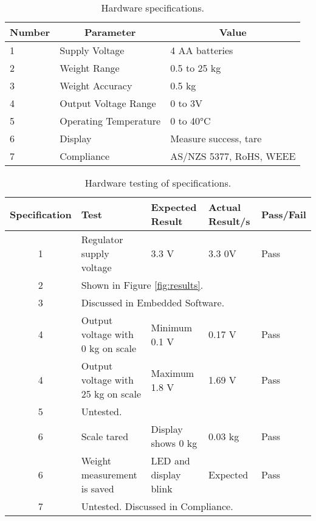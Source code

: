 \begin{table}[!ht]
	\centering
	\caption{Hardware specifications.}
	\begin{tabular}{lll}
		\hline
		\multicolumn{1}{c}{Number} & \multicolumn{1}{c}{Parameter} & \multicolumn{1}{c}{Value} \\
		\hline
		1                          & Supply Voltage                & 4 AA batteries            \\
		2                          & Weight Range                  & 0.5 to 25 kg              \\
		3                          & Weight Accuracy               & 0.5 kg                    \\
		4                          & Output Voltage Range          & 0 to 3V                   \\
		5                          & Operating Temperature         & 0 to 40°C                 \\
		6                          & Display                       & Measure success, tare     \\
		7                          & Compliance                    & AS/NZS 5377, RoHS, WEEE  
	\end{tabular}
	\label{tab:hardware-requirements}
\end{table}

\begin{table}[!ht]
	\centering
	
	\caption{Hardware testing of specifications.}
	\begin{tabular}{cllll}
		\hline
		Specification & Test & Expected Result & Actual Result/s & Pass/Fail\\
		\hline
		1 & Regulator supply voltage & 3.3 V & 3.3 0V & Pass\\
		2 & \multicolumn{4}{l}{Shown in Figure \ref{fig:results}.}\\
		3 & \multicolumn{4}{l}{Discussed in Embedded Software.}\\
		4 & Output voltage with 0 kg on scale & Minimum 0.1 V  & 0.17 V & Pass\\
		4 & Output voltage with 25 kg on scale & Maximum 1.8 V  & 1.69 V & Pass\\
		5 & \multicolumn{4}{l}{Untested.}\\
		6 & Scale tared & Display shows 0 kg  & 0.03 kg
		& Pass\\
		6 & Weight measurement is saved & LED and display blink  & Expected 	 & Pass\\
		7 & \multicolumn{4}{l}{Untested. Discussed in Compliance.}\\
	\end{tabular}
	\label{tab:hardware-testing}
\end{table}

